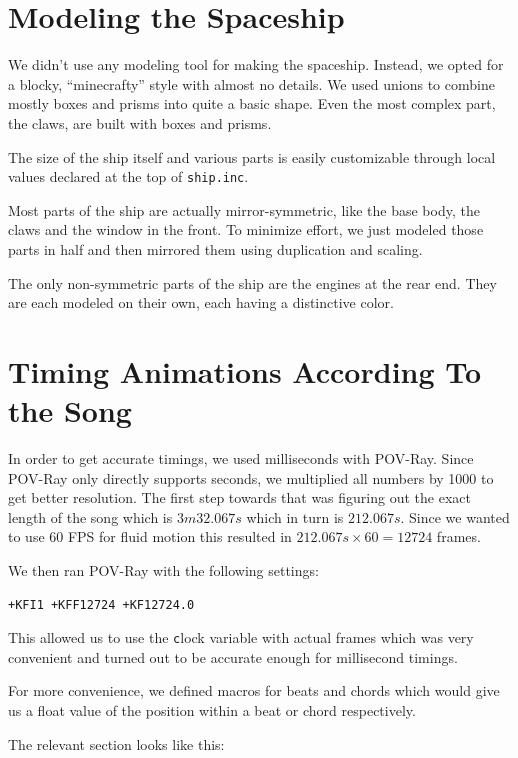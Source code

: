 \documentclass[a4paper, 12pt]{scrartcl}
\begin{document}
    \section{Modeling the Spaceship}
    \label{sec:ship}

    We didn't use any modeling tool for making the spaceship. Instead, we opted for a blocky,
    ``minecrafty'' style with almost no details. We used unions to combine mostly boxes and prisms
    into quite a basic shape. Even the most complex part, the claws, are built with boxes and
    prisms.

    The size of the ship itself and various parts is easily customizable through local values
    declared at the top of \texttt{ship.inc}.

    Most parts of the ship are actually mirror-symmetric, like the base body, the claws and the
    window in the front. To minimize effort, we just modeled those parts in half and then mirrored
    them using duplication and scaling.

    The only non-symmetric parts of the ship are the engines at the rear end. They are each modeled
    on their own, each having a distinctive color.

    \section{Timing Animations According To the Song}

    In order to get accurate timings, we used milliseconds with POV-Ray. Since POV-Ray only
    directly supports seconds, we multiplied all numbers by 1000 to get better resolution.  The
    first step towards that was figuring out the exact length of the song which is \(3m32.067s\)
    which in turn is \(212.067s\). Since we wanted to use 60 FPS for fluid motion this resulted in
    \(212.067s \times 60 = 12724\) frames. 

    We then ran POV-Ray with the following settings:
    \begin{verbatim}+KFI1 +KFF12724 +KF12724.0\end{verbatim}
    This allowed us to use the \texttt clock variable with actual frames
    which was very convenient and turned out to be accurate enough for millisecond timings.

    For more convenience, we defined macros for beats and chords which would give us a float value
    of the position within a beat or chord respectively.

    The relevant section looks like this:
\end{document}
